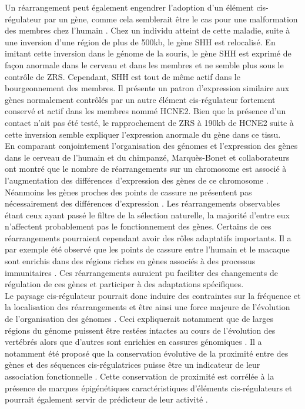 Un réarrangement peut également engendrer l’adoption d’un élément \gls{cis}-régulateur par un gène, comme cela semblerait être le cas pour une malformation des membres chez l’humain \citep{lettice_enhancer-adoption_2011}. Chez un individu atteint de cette maladie, suite à une inversion d’une région de plus de 500kb, le gène \acrshort{SHH} est relocalisé. En imitant cette inversion dans le génome de la souris, le gène \acrshort{SHH} est exprimé de façon anormale dans le cerveau et dans les membres et ne semble plus sous le contrôle de \acrshort{ZRS}. Cependant, \acrshort{SHH} est tout de même actif dans le bourgeonnement des membres. Il présente un patron d’expression similaire aux gènes normalement contrôlés par un autre élément \gls{cis}-régulateur fortement conservé et actif dans les membres nommé HCNE2. Bien que la présence d’un contact n'ait pas été testé, le rapprochement de \acrshort{ZRS} à 190kb de HCNE2 suite à cette inversion semble expliquer l’expression anormale du gène dans ce tissu. \\

En comparant conjointement l’organisation des génomes et l’expression des gènes dans le cerveau de l’humain et du chimpanzé, Marquès-Bonet et collaborateurs ont montré que le nombre de réarrangements sur un chromosome est associé à l’augmentation des différences d’expression des gènes de ce chromosome \citep{marques-bonet_chromosomal_2004}. Néanmoins les gènes proches des points de cassure ne présentent pas nécessairement des différences d’expression \citep{munoz_detection_2012}. Les réarrangements observables étant ceux ayant passé le filtre de la sélection naturelle, la majorité d’entre eux n’affectent probablement pas le fonctionnement des gènes. Certains de ces réarrangements pourraient cependant avoir des rôles adaptatifs importants. Il a par exemple été observé que les points de cassure entre l’humain et le macaque sont enrichis dans des régions riches en gènes associés à des processus immunitaires \citep{ullastres_unraveling_2014}. Ces réarrangements auraient pu faciliter des changements de régulation de ces gènes et participer à des adaptations spécifiques. \\

Le paysage \gls{cis}-régulateur pourrait donc induire des contraintes sur la fréquence et la localisation des réarrangements et être ainsi une force majeure de l’évolution de l’organisation des génomes \citep{mongin_long-range_2009}. Ceci expliquerait notamment que de larges régions du génome puissent être restées intactes au cours de l’évolution des vertébrés alors que d’autres sont enrichies en cassures génomiques \citep{naville_long-range_2015, berthelot_3d_2015}. Il a notamment été proposé que la conservation évolutive de la proximité entre des gènes et des séquences \gls{cis}-régulatrices puisse être un indicateur de leur association fonctionnelle \citep{ahituv_mapping_2005,mongin_long-range_2009, clement_enhancergene_2020}. Cette conservation de proximité est corrélée à la présence de marques épigénétiques caractéristiques d’éléments \gls{cis}-régulateurs et pourrait également servir de prédicteur de leur activité \citep{naville_long-range_2015}. 

